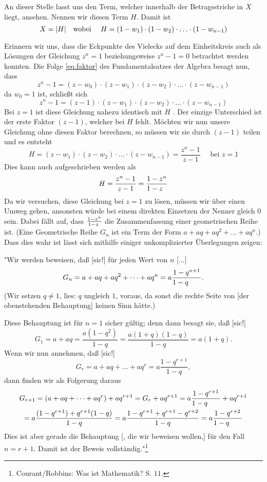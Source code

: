 \documentclass[a4paper,12pt]{article} %
\begin{document}
An dieser Stelle lasst uns den Term, welcher innerhalb der Betragsstriche in $X$ liegt, ansehen.
Nennen wir diesen Term $H$. Damit ist
\begin{equation}\label{H}
	X=|H| \textrm{\quad wobei \quad}	H=(1-w_1)\cdot(1-w_2)\cdot\ldots\cdot(1-w_{n-1})
\end{equation}

Erinnern wir uns, dass die Eckpunkte des Vielecks auf dem Einheitskreis auch als Lösungen der Gleichung $z^n=1$ beziehungsweise $z^n-1=0$ betrachtet werden konnten. Die Folge \eqref{eq.faktor} des Fundamentalsatzes der Algebra besagt nun, dass 
\[z^n-1=(z-w_0)\cdot(z-w_1)\cdot(z-w_2)\cdot\ldots\cdot(z-w_{n-1})\]
da $w_0=1$ ist, schließt sich
\[z^n-1=(z-1)\cdot(z-w_1)\cdot(z-w_2)\cdot\ldots\cdot(z-w_{n-1})\]
Bei $z=1$ ist diese Gleichung nahezu identisch mit $H$ .
Der einzige Unterschied ist der erste Faktor $(z-1)$, welcher bei $H$ fehlt.
Möchten wir nun unsere Gleichung ohne diesen Faktor berechnen, so müssen wir sie durch $(z-1)$ teilen und es entsteht
\begin{equation}\label{bruch}
	H=(z-w_1)\cdot(z-w_2)\cdot\ldots\cdot(z-w_{n-1})=\frac{z^n-1}{z-1} \quad \textrm{ bei } z=1
\end{equation}
 Dies kann auch aufgeschrieben werden als
\[H=\frac{z^n-1}{z-1}=\frac{1-z^n}{1-z\hspace{2mm}}\]
Da wir versuchen, diese Gleichung bei $z=1$ zu lösen, müssen wir über einen Umweg gehen, ansonsten würde bei einem direkten Einsetzen der Nenner gleich $0$ sein.
Dabei fällt auf, dass $\frac{1-z^n}{1-z\hspace{1mm}}$ die Zusammenfassung einer geometrischen Reihe ist.
(Eine Geometrische Reihe $G_n$ ist ein Term der Form $a+aq+aq^2+\dots+aq^n$.)
Dass dies wahr ist lässt sich mithilfe einiger unkomplizierter Überlegungen zeigen:

"Wir werden beweisen, daß [sic!] für jeden Wert von $n$ [$\dots$]
\begin{equation}
	G_n=a+aq+aq^2+\dots+aq^n=a\frac{1-q^{n+1}}{1-q\hspace{6mm}}.
\end{equation} 
(Wir setzen $q\ne1$, lies: $q$ ungleich $1$, voraus, da sonst die rechte Seite von [der obenstehenden Behauptung] keinen Sinn hätte.)

Diese Behauptung ist für $n=1$ sicher gültig; denn dann besagt sie, daß [sic!]
\[G_1=a+aq=\frac{a(1-q^2)}{1-q}=\frac{a(1+q)(1-q)}{1-q}=a(1+q).\]
Wenn wir nun annehmen, daß [sic!]
\[G_r=a+aq+\dots+aq^r=a\frac{1-q^{r+1}}{1-q},\]
dann finden wir als Folgerung daraus
\begin{multline}
	G_{r+1}=(a+aq+\dots+aq^r)+aq^{r+1}=G_r+aq^{r+1}=a\frac{1-q^{r+1}}{1-q\hspace{6mm}}+aq^{r+1}\\
	=a\frac{(1-q^{r+1})+q^{r+1}(1-q)}{1-q}=a\frac{1-q^{r+1}+q^{r+1}-q^{r+2}}{1-q}=a\frac{1-q^{r+2}}{1-q\hspace{6mm}}
\end{multline}
Dies ist aber gerade die Behauptung [, die wir beweisen wollen,] für den Fall $n=r+1$. Damit ist der Beweis vollständig."\footnote{Courant/Robbins: Was ist Mathematik? S. $11$.}
\end{document}
